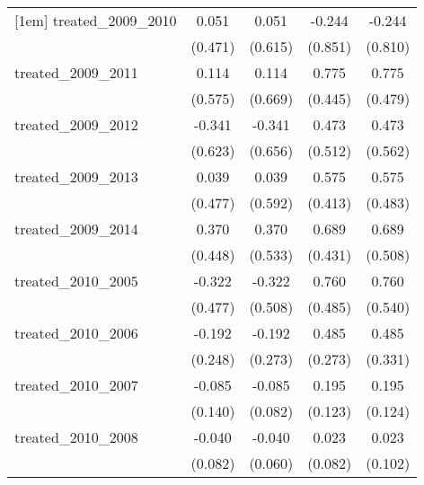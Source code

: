 {\begin{tabular}{l*{4}{c}}
[1em]
treated\_2009\_2010&       0.051         &       0.051         &      -0.244         &      -0.244         \\
            &     (0.471)         &     (0.615)         &     (0.851)         &     (0.810)         \\
[1em]
treated\_2009\_2011&       0.114         &       0.114         &       0.775         &       0.775         \\
            &     (0.575)         &     (0.669)         &     (0.445)         &     (0.479)         \\
[1em]
treated\_2009\_2012&      -0.341         &      -0.341         &       0.473         &       0.473         \\
            &     (0.623)         &     (0.656)         &     (0.512)         &     (0.562)         \\
[1em]
treated\_2009\_2013&       0.039         &       0.039         &       0.575         &       0.575         \\
            &     (0.477)         &     (0.592)         &     (0.413)         &     (0.483)         \\
[1em]
treated\_2009\_2014&       0.370         &       0.370         &       0.689         &       0.689         \\
            &     (0.448)         &     (0.533)         &     (0.431)         &     (0.508)         \\
[1em]
treated\_2010\_2005&      -0.322         &      -0.322         &       0.760         &       0.760         \\
            &     (0.477)         &     (0.508)         &     (0.485)         &     (0.540)         \\
[1em]
treated\_2010\_2006&      -0.192         &      -0.192         &       0.485         &       0.485         \\
            &     (0.248)         &     (0.273)         &     (0.273)         &     (0.331)         \\
[1em]
treated\_2010\_2007&      -0.085         &      -0.085         &       0.195         &       0.195         \\
            &     (0.140)         &     (0.082)         &     (0.123)         &     (0.124)         \\
[1em]
treated\_2010\_2008&      -0.040         &      -0.040         &       0.023         &       0.023         \\
            &     (0.082)         &     (0.060)         &     (0.082)         &     (0.102)         \\

\end{tabular}}
